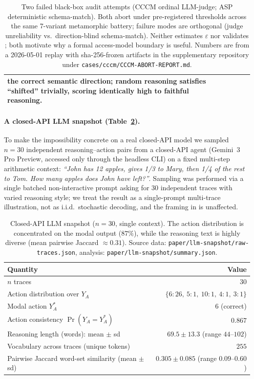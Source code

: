 \documentclass{article}
\theoremstyle{plain}
\theoremstyle{definition}
\theoremstyle{remark}
\begin{document}
\begin{table}[h]
\begin{tabular}{p{1.7cm}p{3.4cm}p{3.6cm}p{4cm}}
the correct semantic direction; random reasoning satisfies ``shifted''
trivially, scoring identically high to faithful reasoning. \\
\bottomrule
\end{tabular}
\caption{Two failed black-box audit attempts (CCCM ordinal LLM-judge;
ASP deterministic schema-match). Both abort under pre-registered
thresholds across the same 7-variant metamorphic battery; failure
modes are orthogonal (judge unreliability vs.\ direction-blind
schema-match). Neither estimates $\varepsilon$ nor validates
; both motivate why a formal access-model
boundary is useful. Numbers are from a 2026-05-01 replay with sha-256-frozen
artifacts in the supplementary repository under
\texttt{cases/cccm/CCCM-ABORT-REPORT.md}.}
\label{tab:empirical-fails}
\end{table}

\paragraph{A closed-API LLM snapshot (Table~\ref{tab:llm-snapshot}).}
To make the impossibility concrete on a real closed-API model we sampled
$n = 30$ independent reasoning--action pairs from a closed-API agent
(Gemini~3 Pro Preview, accessed only through the headless CLI) on a fixed
multi-step arithmetic context: \emph{``John has 12 apples, gives 1/3 to Mary,
then 1/4 of the rest to Tom. How many apples does John have left?''}. Sampling
was performed via a single batched non-interactive prompt asking for 30
independent traces with varied reasoning style; we treat the result as a
single-prompt multi-trace illustration, not as i.i.d.\ stochastic decoding,
and the framing in  is unaffected.

\begin{table}[h]
\centering\small
\begin{tabular}{lr}
\toprule
Quantity & Value \\
\midrule
$n$ traces & $30$ \\
Action distribution over $Y_A$ &
  $\{6\!:\!26,\ 5\!:\!1,\ 10\!:\!1,\ 4\!:\!1,\ 3\!:\!1\}$ \\
Modal action $Y_A^*$ & $6$ (correct) \\
Action consistency $\Pr(Y_A = Y_A^*)$ & $0.867$ \\
Reasoning length (words): mean $\pm$ sd & $69.5 \pm 13.3$ (range $44$--$102$) \\
Vocabulary across traces (unique tokens) & $255$ \\
Pairwise Jaccard word-set similarity (mean $\pm$ sd) & $0.305 \pm 0.085$ (range $0.09$--$0.60$) \\
\bottomrule
\end{tabular}
\caption{Closed-API LLM snapshot ($n=30$, single context). The action
distribution is concentrated on the modal output ($87\%$), while the
reasoning text is highly diverse (mean pairwise Jaccard
$\approx 0.31$). Source data: \texttt{paper/llm-snapshot/raw-traces.json},
analysis: \texttt{paper/llm-snapshot/summary.json}.}
\label{tab:llm-snapshot}
\end{table}
\end{document}
